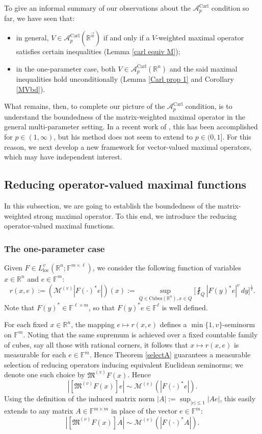 \documentclass[11pt, reqno]{amsart}
\theoremstyle{definition}
\theoremstyle{remark}
\numberwithin{equation}{section}
\newcommand{\A}{\mathscr A}
\newcommand{\F}{\mathbb F}
\newcommand{\M}{\mathfrak M}
\newcommand{\R}{\mathbb R}
\newcommand{\vn}{\vec n}
\newcommand{\loc}{\mathrm{loc}}
\newcommand{\abs}[1]{|#1|}
\newcommand{\Carl}{\mathrm{Carl}}
\newcommand{\Cubes}{\mathrm{Cubes}}
\newcommand{\AC}{\A^{\Carl}}
\begin{document}
To give an informal summary of our observations about the $\AC_p$ condition so far, we have seen that:
\begin{itemize}
\item in general, $V\in\AC_p(\R^{\vn})$ if and only if a $V$-weighted maximal operator satisfies certain inequalities (Lemma \ref{carl equiv M});
\item in the one-parameter case, both $V\in\AC_p(\R^{n})$ and the said maximal inequalities hold unconditionally (Lemma \ref{Carl prop 1} and Corollary \ref{MVbd}).
\end{itemize}
What remains, then, to complete our picture of the $\AC_p$ condition, is to understand the boundedness of the matrix-weighted maximal operator in the general multi-parameter setting. In a recent work of \cite{Vuo24}, this has been accomplished for $p\in(1,\infty)$, but his method does not seem to extend to $p\in(0,1]$. For this reason, we next develop a new framework for vector-valued maximal operators, which may have independent interest.

\subsection{Reducing operator-valued maximal functions}\label{red M}

In this subsection, we are going to establish the boundedness of
the matrix-weighted strong maximal operator.
To this end, we introduce the reducing operator-valued maximal functions.

\subsubsection{The one-parameter case}

Given $F\in L^v_{\loc}(\R^n;\F^{m\times\ell})$, we consider the following function of variables $x\in\R^n$ and $e\in\F^m$:
\begin{equation*}
r(x,e)
:=(\mathcal M^{(v)}\abs{F(\cdot)^*e})(x)
:=\sup_{Q\in\Cubes(\R^{n}), x\in Q} \bigg[\fint_Q\abs{F(y)^*e}^v \, dy\bigg]^{\frac 1v}.
\end{equation*}
Note that $F(y)^*\in\F^{\ell\times m}$, so that $F(y)^*e\in\F^\ell$ is well defined.

For each fixed $x\in\R^n$, the mapping $e\mapsto r(x,e)$ defines a $\min\{1,v\}$-seminorm on $\F^m$.
Noting that the same supremum is achieved over a fixed countable family of cubes,
say all those with rational corners, it follows that
$x\mapsto r(x,e)$ is measurable for each $e\in\F^m$.
Hence Theorem \ref{selectA} guarantees a measurable selection of
reducing operators inducing equivalent Euclidean seminorms;
we denote one such choice by $\M^{(v)}F(x)$. Hence
\begin{equation*}
\abs{[\M^{(v)}F(x)]e}\sim \mathcal M^{(v)}(|F(\cdot)^*e|).
\end{equation*}
Using the definition of the induced matrix norm $\abs{A}:=\sup_{\abs{e}\leq 1}\abs{Ae}$, this easily extends to any matrix $A\in\F^{m\times m}$ in place of the vector $e\in\F^m$:
\begin{equation}\label{MA}
\abs{[\M^{(v)}F(x)] A}\sim \mathcal M^{(v)}(|F(\cdot)^*A|).
\end{equation}
\end{document}
